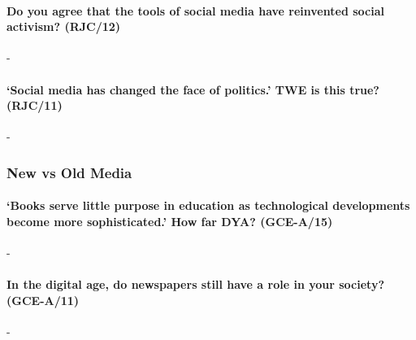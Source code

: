 \documentclass[../../main]{subfiles}
\begin{document}
\paragraph{Do you agree that the tools of social media have reinvented social activism? (RJC/12)}-

\paragraph{`Social media has changed the face of politics.' TWE is this true? (RJC/11)}-


\subsubsection{New vs Old Media}

\paragraph{`Books serve little purpose in education as technological developments become more sophisticated.' How far DYA? (GCE-A/15)}-

\paragraph{In the digital age, do newspapers still have a role in your society? (GCE-A/11)}-
\end{document}
